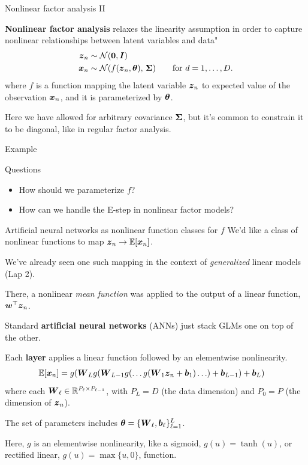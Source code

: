 \documentclass[aspectratio=169]{beamer}
\begin{document}
\begin{frame}{Nonlinear factor analysis II}
    
\textbf{Nonlinear factor analysis} relaxes the linearity assumption in order to capture nonlinear relationships between latent variables and data"
\begin{align}
\boldsymbol{z}_n &\sim \mathcal{N}(\boldsymbol{0}, \boldsymbol{I}) \\
\boldsymbol{x}_n &\sim \mathcal{N}(f(\boldsymbol{z}_n, \boldsymbol{\theta}), \, \boldsymbol{\Sigma}) \qquad \text{for } d=1,\ldots,D. 
\end{align}
where $f$ is a function mapping the latent variable $\boldsymbol{z}_n$ to expected value of the observation $\boldsymbol{x}_n$, and it is parameterized by $\boldsymbol{\theta}$.

Here we have allowed for arbitrary covariance $\boldsymbol{\Sigma}$, but it's common to constrain it to be diagonal, like in regular factor analysis. 

\end{frame}

\begin{frame}{Example}
    
\end{frame}

\begin{frame}[t]{Questions}
\begin{itemize}
    \item How should we parameterize $f$?
    \item How can we handle the E-step in nonlinear factor models?
\end{itemize}
\end{frame}

\begin{frame}{Artificial neural networks as nonlinear function classes for $f$}
We'd like a class of nonlinear functions to map $\boldsymbol{z}_n \to \mathbb{E}[\boldsymbol{x}_n]$. 

We've already seen one such mapping in the context of \textit{generalized} linear models (Lap 2). 

There, a nonlinear \textit{mean function} was applied to the output of a linear function, $\boldsymbol{w}^\top \boldsymbol{z}_n$.

Standard \textbf{artificial neural networks} (ANNs) just stack GLMs one on top of the other. 

Each \textbf{layer} applies a linear function followed by an elementwise nonlinearity. 
\begin{align}
    \mathbb{E}[\boldsymbol{x}_n] &= g(\boldsymbol{W}_L g(\boldsymbol{W}_{L-1} g(\ldots g(\boldsymbol{W}_1 \boldsymbol{z}_n +  \boldsymbol{b}_1) \ldots ) + \boldsymbol{b}_{L-1}) + \boldsymbol{b}_L)
\end{align}
where each $\boldsymbol{W}_\ell \in \mathbb{R}^{P_\ell \times P_{\ell-1}}$, with $P_L=D$ (the data dimension) and $P_0=P$ (the dimension of $\boldsymbol{z}_n$).  

The set of parameters includes $\boldsymbol{\theta}= \{\boldsymbol{W}_\ell, \boldsymbol{b}_\ell\}_{\ell=1}^L$.

Here, $g$ is an elementwise nonlinearity, like a sigmoid, $g(u) = \tanh(u)$, or rectified linear, $g(u) = \max\{u, 0\}$, function. 
\end{frame}
\end{document}
